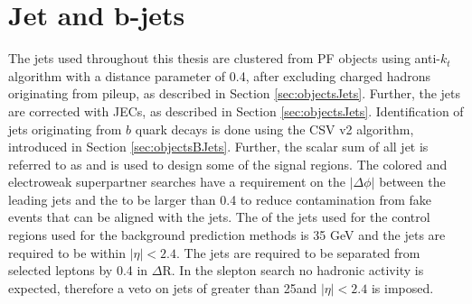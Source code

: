 \section{Jet and b-jets}\label{sec:jetSelections}
\noindent
\justify
The jets used throughout this thesis are clustered from PF objects using anti-$k_{t}$ algorithm with a distance parameter of 0.4, after excluding charged hadrons originating from pileup, as described in Section \ref{sec:objectsJets}.
Further, the jets are corrected with JECs, as described in Section \ref{sec:objectsJets}. 
Identification of jets originating from $b$ quark decays is done using the CSV v2 algorithm, introduced in Section \ref{sec:objectsBJets}.
Further, the scalar sum of all jet \pt is referred to as \HT and is used to design some of the signal regions.
The colored and electroweak superpartner searches have a requirement on the $|\Delta\phi|$ between the leading jets and the \ptmiss to be larger than 0.4 to reduce contamination from fake \ptmiss events that can be aligned with the jets.   
The \pt of the jets used for the control regions used for the background prediction methods is 35 GeV and the jets are required to be within $|\eta|<2.4$. 
The jets are required to be separated from selected leptons by 0.4 in $\Delta$R. 
In the slepton search no hadronic activity is expected, therefore a veto on jets of \pt greater than 25\GeV and $|\eta|<2.4$ is imposed.
